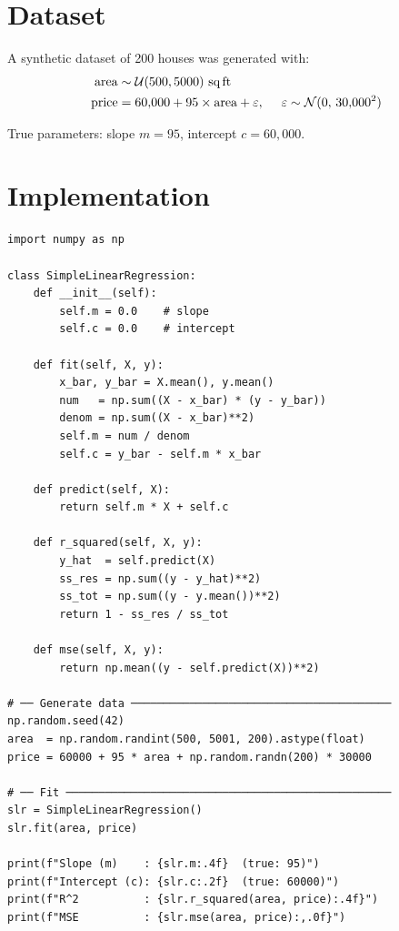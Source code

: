\documentclass[12pt,a4paper]{article}
\begin{document}
\section{Dataset}

A synthetic dataset of 200 houses was generated with:
\begin{align*}
  \text{area}  &\sim \mathcal{U}(500, 5000)\ \text{sq\,ft} \\
  \text{price} &= 60{,}000 + 95 \times \text{area} + \varepsilon,\ \quad \varepsilon \sim \mathcal{N}(0,\,30{,}000^2)
\end{align*}

True parameters: slope $m = 95$, intercept $c = 60{,}000$.

\section{Implementation}

\begin{lstlisting}[caption={SimpleLinearRegression — OLS closed-form}]
import numpy as np

class SimpleLinearRegression:
    def __init__(self):
        self.m = 0.0    # slope
        self.c = 0.0    # intercept

    def fit(self, X, y):
        x_bar, y_bar = X.mean(), y.mean()
        num   = np.sum((X - x_bar) * (y - y_bar))
        denom = np.sum((X - x_bar)**2)
        self.m = num / denom
        self.c = y_bar - self.m * x_bar

    def predict(self, X):
        return self.m * X + self.c

    def r_squared(self, X, y):
        y_hat  = self.predict(X)
        ss_res = np.sum((y - y_hat)**2)
        ss_tot = np.sum((y - y.mean())**2)
        return 1 - ss_res / ss_tot

    def mse(self, X, y):
        return np.mean((y - self.predict(X))**2)

# ── Generate data ────────────────────────────────────────
np.random.seed(42)
area  = np.random.randint(500, 5001, 200).astype(float)
price = 60000 + 95 * area + np.random.randn(200) * 30000

# ── Fit ──────────────────────────────────────────────────
slr = SimpleLinearRegression()
slr.fit(area, price)

print(f"Slope (m)    : {slr.m:.4f}  (true: 95)")
print(f"Intercept (c): {slr.c:.2f}  (true: 60000)")
print(f"R^2          : {slr.r_squared(area, price):.4f}")
print(f"MSE          : {slr.mse(area, price):,.0f}")
\end{lstlisting}
\end{document}
